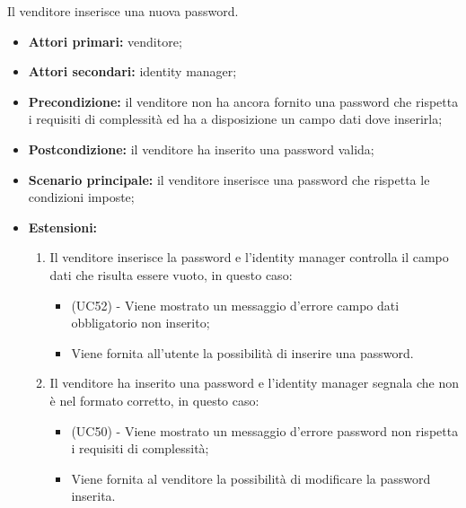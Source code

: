 Il venditore inserisce una nuova password.
\begin{itemize}
	\item \textbf{Attori primari:} venditore;
	\item \textbf{Attori secondari:} identity manager;
	\item \textbf{Precondizione:} il venditore non ha ancora fornito una password che rispetta i requisiti di complessità ed ha a disposizione un campo dati dove inserirla;
	\item \textbf{Postcondizione:} il venditore ha inserito una password valida;
	\item \textbf{Scenario principale:} il venditore inserisce una password che rispetta le condizioni imposte;
	\item \textbf{Estensioni:}
	\begin{enumerate}[label=\lett]
		\item Il venditore inserisce la password e l'identity manager controlla il campo dati che risulta essere vuoto, in questo caso:
		\begin{itemize}
			\item (UC52) - Viene mostrato un messaggio d'errore campo dati obbligatorio non inserito;
			\item Viene fornita all'utente la possibilità di inserire una password.
		\end{itemize}
		\item Il venditore ha inserito una password e l'identity manager segnala che non è nel formato corretto, in questo caso:
		\begin{itemize}
			\item (UC50) - Viene mostrato un messaggio d'errore password non rispetta i requisiti di complessità;
			\item Viene fornita al venditore la possibilità di modificare la password inserita.
		\end{itemize}
	\end{enumerate} 
\end{itemize}

